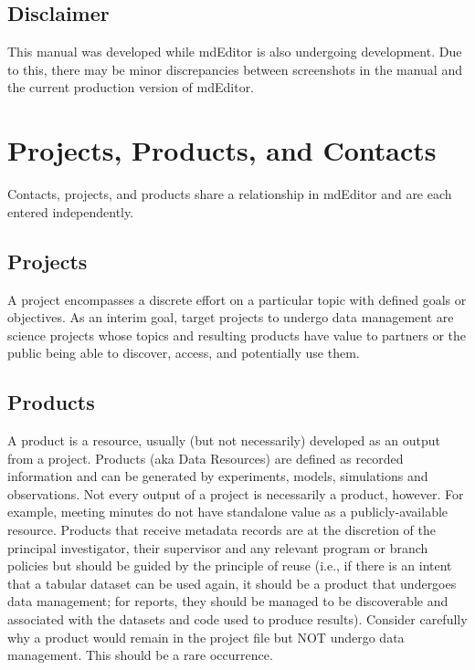 \documentclass[
]{book}
\begin{document}
\hypertarget{disclaimer}{%
\section{Disclaimer}\label{disclaimer}}

This manual was developed while mdEditor is also undergoing development. Due to this, there may be minor discrepancies between screenshots in the manual and the current production version of mdEditor.

\mainmatter

\hypertarget{projects-products-and-contacts}{%
\chapter{Projects, Products, and Contacts}\label{projects-products-and-contacts}}

Contacts, projects, and products share a relationship in mdEditor and are each entered independently.

\hypertarget{projects}{%
\section{Projects}\label{projects}}

A project encompasses a discrete effort on a particular topic with defined goals or objectives. As an interim goal, target projects to undergo data management are science projects whose topics and resulting products have value to partners or the public being able to discover, access, and potentially use them.

\hypertarget{products}{%
\section{Products}\label{products}}

A product is a resource, usually (but not necessarily) developed as an output from a project. Products (aka Data Resources) are defined as recorded information and can be generated by experiments, models, simulations and observations. Not every output of a project is necessarily a product, however. For example, meeting minutes do not have standalone value as a publicly-available resource. Products that receive metadata records are at the discretion of the principal investigator, their supervisor and any relevant program or branch policies but should be guided by the principle of reuse (i.e., if there is an intent that a tabular dataset can be used again, it should be a product that undergoes data management; for reports, they should be managed to be discoverable and associated with the datasets and code used to produce results). Consider carefully why a product would remain in the project file but NOT undergo data management. This should be a rare occurrence.
\end{document}
